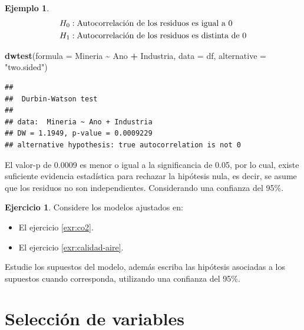 \documentclass[
  11pt,
]{book}
\newenvironment{Shaded}{\begin{snugshade}}{\end{snugshade}}
\newcommand{\AttributeTok}[1]{\textcolor[rgb]{0.13,0.29,0.53}{#1}}
\newcommand{\FunctionTok}[1]{\textcolor[rgb]{0.13,0.29,0.53}{\textbf{#1}}}
\newcommand{\NormalTok}[1]{#1}
\newcommand{\SpecialCharTok}[1]{\textcolor[rgb]{0.81,0.36,0.00}{\textbf{#1}}}
\newcommand{\StringTok}[1]{\textcolor[rgb]{0.31,0.60,0.02}{#1}}
\providecommand{\tightlist}{%
  \setlength{\itemsep}{0pt}\setlength{\parskip}{0pt}}
\theoremstyle{definition}
\theoremstyle{definition}
\newtheorem{example}{Ejemplo}[chapter]
\theoremstyle{definition}
\newtheorem{exercise}{Ejercicio}[chapter]
\theoremstyle{definition}
\theoremstyle{remark}
\begin{document}
\begin{example}
\begin{equation}
\notag
\begin{split}
H_0&: \text{Autocorrelación de los residuos es igual a 0}\\
H_1&: \text{Autocorrelación de los residuos es distinta de 0}\\
\end{split}
\end{equation}

\begin{Shaded}
\begin{Highlighting}[]
\FunctionTok{dwtest}\NormalTok{(}\AttributeTok{formula =}\NormalTok{ Mineria }\SpecialCharTok{\textasciitilde{}}\NormalTok{ Ano }\SpecialCharTok{+}\NormalTok{ Industria, }\AttributeTok{data =}\NormalTok{ df, }\AttributeTok{alternative =} \StringTok{"two.sided"}\NormalTok{)}
\end{Highlighting}
\end{Shaded}

\begin{verbatim}
## 
##  Durbin-Watson test
## 
## data:  Mineria ~ Ano + Industria
## DW = 1.1949, p-value = 0.0009229
## alternative hypothesis: true autocorrelation is not 0
\end{verbatim}

El valor-p de 0.0009 es menor o igual a la significancia de 0.05, por lo cual, existe suficiente evidencia estadística para rechazar la hipótesis nula, es decir, se asume que los residuos no son independientes. Considerando una confianza del 95\%.
\end{example}

\begin{exercise}
Considere los modelos ajustados en:

\begin{itemize}
\tightlist
\item
  El ejercicio \ref{exr:co2}.
\item
  El ejercicio \ref{exr:calidad-aire}.
\end{itemize}

Estudie los supuestos del modelo, además escriba las hipótesis asociadas a los supuestos cuando corresponda, utilizando una confianza del 95\%.
\end{exercise}

\section{Selección de variables}\label{regresion-lineal-seleccion-variables}
\end{document}
